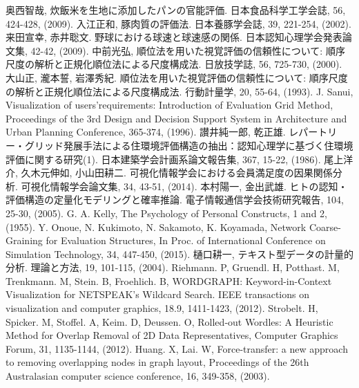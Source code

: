 \documentclass[syuuron]{kuee}
\begin{document}


\begin{thebibliography}{数字}
	 奥西智哉, 炊飯米を生地に添加したパンの官能評価. 日本食品科学工学会誌, 56, 424-428, (2009).
	 入江正和, 豚肉質の評価法. 日本養豚学会誌, 39, 221-254, (2002).
	 来田宣幸, 赤井聡文. 野球における球速と球速感の関係. 日本認知心理学会発表論文集, 42-42, (2009).
	 中前光弘, 順位法を用いた視覚評価の信頼性について: 順序尺度の解析と正規化順位法による尺度構成法. 日放技学誌, 56, 725-730, (2000).
	 大山正, 瀧本誓, 岩澤秀紀. 順位法を用いた視覚評価の信頼性について: 順序尺度の解析と正規化順位法による尺度構成法. 行動計量学, 20, 55-64, (1993).
	 J. Sanui, Visualization of users’requirements: Introduction of Evaluation Grid Method, Proceedings of the 3rd Design and Decision Support System in Architecture and Urban Planning Conference, 365-374, (1996).
	 讃井純一郎, 乾正雄. レパートリー・グリッド発展手法による住環境評価構造の抽出：認知心理学に基づく住環境評価に関する研究(1). 日本建築学会計画系論文報告集, 367, 15-22, (1986).
	 尾上洋介, 久木元伸如, 小山田耕二. 可視化情報学会における会員満足度の因果関係分析. 可視化情報学会論文集, 34, 43-51, (2014).
	 本村陽一, 金出武雄. ヒトの認知・評価構造の定量化モデリングと確率推論. 電子情報通信学会技術研究報告, 104, 25-30, (2005).
	 G. A. Kelly, The Psychology of Personal Constructs, 1 and 2, (1955).
	 Y. Onoue, N. Kukimoto, N. Sakamoto, K. Koyamada, Network Coarse-Graining for Evaluation Structures, In Proc. of International Conference on Simulation Technology, 34, 447-450, (2015). 
	 樋口耕一, テキスト型データの計量的分析. 理論と方法, 19, 101-115, (2004).
	 Riehmann. P, Gruendl. H, Potthast. M, Trenkmann. M, Stein. B, Froehlich. B, WORDGRAPH: Keyword-in-Context Visualization for NETSPEAK's Wildcard Search. IEEE transactions on visualization and computer graphics, 18.9, 1411-1423, (2012).
	 Strobelt. H, Spicker. M, Stoffel. A, Keim. D, Deussen. O, Rolled‐out Wordles: A Heuristic Method for Overlap Removal of 2D Data Representatives, Computer Graphics Forum, 31, 1135-1144, (2012).
	 Huang. X, Lai. W, Force-transfer: a new approach to removing overlapping nodes in graph layout, Proceedings of the 26th Australasian computer science conference, 16, 349-358, (2003).

\end{thebibliography}
\end{document}
